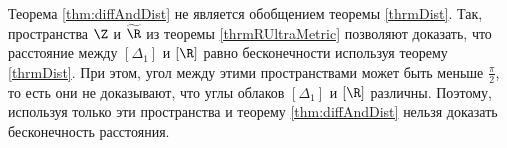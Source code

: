 \begin{remark}
  Теорема \ref{thm:diffAndDist} не является обобщением теоремы
  \ref{thrmDist}. Так, пространства \( \Z \) и \( \widetilde \R \) из
  теоремы \ref{thrmRUltraMetric} позволяют доказать, что расстояние
  между \( [\Delta _1] \) и \( [\R] \) равно бесконечности
  используя теорему  \ref{thrmDist}. При этом, угол между этими
  пространствами может быть меньше \( \frac \pi 2 \), то есть они не
  доказывают, что углы облаков \( [\Delta _1] \) и \( [\R] \) различны. Поэтому,
  используя только эти пространства и теорему  \ref{thm:diffAndDist}
  нельзя доказать бесконечность расстояния.
\end{remark}
